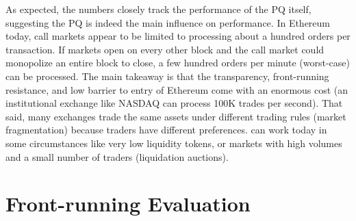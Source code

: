 As expected, the numbers closely track the performance of the PQ itself, suggesting the PQ is indeed the main influence on performance. In Ethereum today, call markets appear to be limited to processing about a hundred orders per transaction. If markets open on every other block and the call market could monopolize an entire block to close, a few hundred orders per minute (worst-case) can be processed. The main takeaway is that the transparency, front-running resistance, and low barrier to entry of Ethereum come with an enormous cost (\ie an institutional exchange like NASDAQ can process 100K trades per second). That said, many exchanges trade the same assets under different trading rules (\ie market fragmentation) because traders have different preferences. \cm can work today in some circumstances like very low liquidity tokens, or markets with high volumes and a small number of traders (\eg liquidation auctions).

\section{Front-running Evaluation} \label{sec:front}


%



